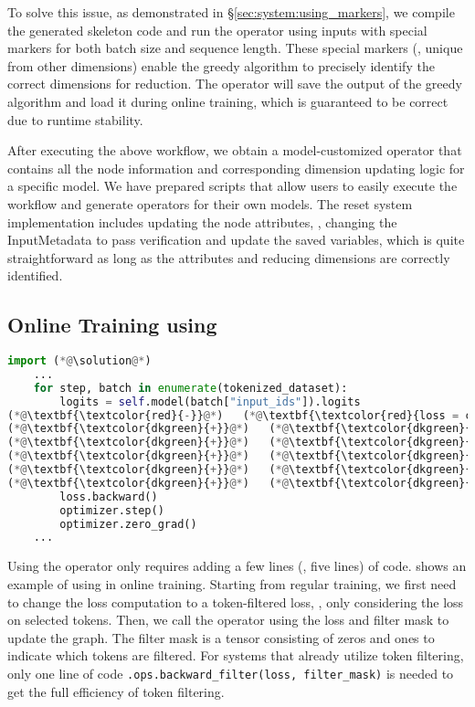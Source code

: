 To solve this issue, as demonstrated in \S\ref{sec:system:using_markers}, we compile the generated skeleton code and run the operator using inputs with special markers for both batch size and sequence length. These special markers (\ie, unique from other dimensions) enable the greedy algorithm to precisely identify the correct dimensions for reduction. The operator will save the output of the greedy algorithm and load it during online training, which is guaranteed to be correct due to runtime stability.

After executing the above workflow, we obtain a model-customized operator that contains all the node information and corresponding dimension updating logic for a specific model. We have prepared scripts that allow users to easily execute the workflow and generate operators for their own models. The reset system implementation includes updating the node attributes, \eg, changing the InputMetadata to pass verification and update the saved variables, which is quite straightforward as long as the attributes and reducing dimensions are correctly identified.

\subsection{Online Training using \solution} \label{sec:imple:online}

\vspace{+2mm}
\begin{lstlisting}[language=Python, caption={Using \solution in the online training.}, label={code:online}]
	import (*@\solution@*)
	...
	for step, batch in enumerate(tokenized_dataset):
		logits = self.model(batch["input_ids"]).logits
(*@\textbf{\textcolor{red}{-}}@*)   (*@\textbf{\textcolor{red}{loss = causal\_loss(batch["input\_ids"], logits)}}@*)
(*@\textbf{\textcolor{dkgreen}{+}}@*)   (*@\textbf{\textcolor{dkgreen}{loss, filter\_mask = token\_filter\_loss(}}@*)
(*@\textbf{\textcolor{dkgreen}{+}}@*)   (*@\textbf{\textcolor{dkgreen}{\ \ \ \ batch["input\_ids"], logits,}}@*)
(*@\textbf{\textcolor{dkgreen}{+}}@*)   (*@\textbf{\textcolor{dkgreen}{\ \ \ \ ref\_loss=batch["ref\_loss"], drop\_rate=0.4,}}@*)
(*@\textbf{\textcolor{dkgreen}{+}}@*)   (*@\textbf{\textcolor{dkgreen}{)}}@*)
(*@\textbf{\textcolor{dkgreen}{+}}@*)   (*@\textbf{\textcolor{dkgreen}{\solution.ops.backward\_filter(loss, filter\_mask)}}@*)
		loss.backward()
		optimizer.step()
		optimizer.zero_grad()
	...
\end{lstlisting}

\noindent Using the operator only requires adding a few lines (\ie, five lines) of code.  shows an example of using \solution in online training. Starting from regular training, we first need to change the loss computation to a token-filtered loss, \ie, only considering the loss on selected tokens. Then, we call the \solution operator using the loss and filter mask to update the graph. The filter mask is a tensor consisting of zeros and ones to indicate which tokens are filtered. For systems that already utilize token filtering, only one line of code \texttt{\solution.ops.backward\_filter(loss, filter\_mask)} is needed to get the full efficiency of token filtering.
